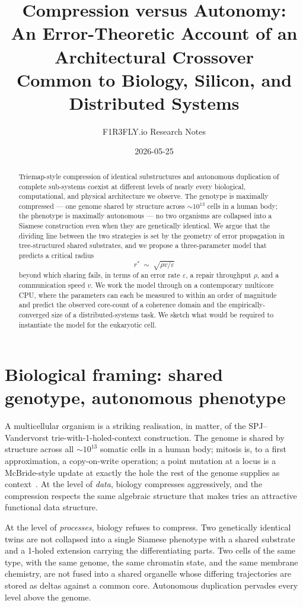 \documentclass[11pt]{article}
\title{Compression versus Autonomy:\\
\large An Error-Theoretic Account of an Architectural Crossover\\
\large Common to Biology, Silicon, and Distributed Systems}
\author{F1R3FLY.io Research Notes}
\date{2026-05-25}
\begin{document}
\maketitle

\begin{abstract}
\noindent
Triemap-style compression of identical substructures and autonomous duplication of complete sub-systems coexist at different levels of nearly every biological, computational, and physical architecture we observe. The genotype is maximally compressed --- one genome shared by structure across $\sim 10^{13}$ cells in a human body; the phenotype is maximally autonomous --- no two organisms are collapsed into a Siamese construction even when they are genetically identical. We argue that the dividing line between the two strategies is set by the geometry of error propagation in tree-structured shared substrates, and we propose a three-parameter model that predicts a critical radius
\[
  r^{\ast} \;\sim\; \sqrt{\rho v / \varepsilon}
\]
beyond which sharing fails, in terms of an error rate $\varepsilon$, a repair throughput $\rho$, and a communication speed $v$. We work the model through on a contemporary multicore CPU, where the parameters can each be measured to within an order of magnitude and predict the observed core-count of a coherence domain and the empirically-converged size of a distributed-systems task. We sketch what would be required to instantiate the model for the eukaryotic cell.
\end{abstract}

\section{Biological framing: shared genotype, autonomous phenotype}

A multicellular organism is a striking realisation, in matter, of the SPJ--Vandervorst trie-with-1-holed-context construction. The genome is shared by structure across all $\sim 10^{13}$ somatic cells in a human body; mitosis is, to a first approximation, a copy-on-write operation; a point mutation at a locus is a McBride-style update at exactly the hole the rest of the genome supplies as context~\cite{spj-triemaps,mcbride-derivative,vandervorst-pathmap}. At the level of \emph{data}, biology compresses aggressively, and the compression respects the same algebraic structure that makes tries an attractive functional data structure.

At the level of \emph{processes}, biology refuses to compress. Two genetically identical twins are not collapsed into a single Siamese phenotype with a shared substrate and a 1-holed extension carrying the differentiating parts. Two cells of the same type, with the same genome, the same chromatin state, and the same membrane chemistry, are not fused into a shared organelle whose differing trajectories are stored as deltas against a common core. Autonomous duplication pervades every level above the genome.
\end{document}
